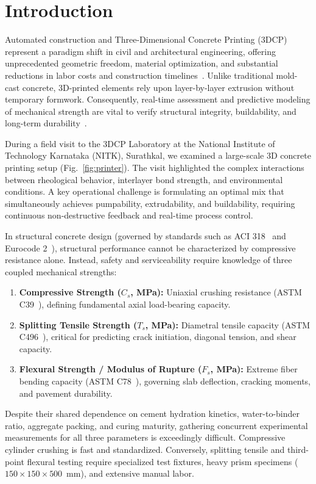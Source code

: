 \documentclass[conference]{IEEEtran}
\begin{document}
\section{Introduction}

Automated construction and Three-Dimensional Concrete Printing (3DCP) represent a paradigm shift in civil and architectural engineering, offering unprecedented geometric freedom, material optimization, and substantial reductions in labor costs and construction timelines~\cite{buswell20183d, ali2023machine}. Unlike traditional mold-cast concrete, 3D-printed elements rely upon layer-by-layer extrusion without temporary formwork. Consequently, real-time assessment and predictive modeling of mechanical strength are vital to verify structural integrity, buildability, and long-term durability~\cite{zhang2025research}.

During a field visit to the 3DCP Laboratory at the National Institute of Technology Karnataka (NITK), Surathkal, we examined a large-scale 3D concrete printing setup (Fig.~\ref{fig:printer}). The visit highlighted the complex interactions between rheological behavior, interlayer bond strength, and environmental conditions. A key operational challenge is formulating an optimal mix that simultaneously achieves pumpability, extrudability, and buildability, requiring continuous non-destructive feedback and real-time process control.

In structural concrete design (governed by standards such as ACI 318~\cite{aci318_19} and Eurocode 2~\cite{eurocode2}), structural performance cannot be characterized by compressive resistance alone. Instead, safety and serviceability require knowledge of three coupled mechanical strengths:
\begin{enumerate}
    \item \textbf{Compressive Strength ($C_s$, MPa):} Uniaxial crushing resistance (ASTM C39~\cite{astm_c39}), defining fundamental axial load-bearing capacity.
    \item \textbf{Splitting Tensile Strength ($T_s$, MPa):} Diametral tensile capacity (ASTM C496~\cite{astm_c496}), critical for predicting crack initiation, diagonal tension, and shear capacity.
    \item \textbf{Flexural Strength / Modulus of Rupture ($F_s$, MPa):} Extreme fiber bending capacity (ASTM C78~\cite{astm_c78}), governing slab deflection, cracking moments, and pavement durability.
\end{enumerate}

Despite their shared dependence on cement hydration kinetics, water-to-binder ratio, aggregate packing, and curing maturity, gathering concurrent experimental measurements for all three parameters is exceedingly difficult. Compressive cylinder crushing is fast and standardized. Conversely, splitting tensile and third-point flexural testing require specialized test fixtures, heavy prism specimens ($150 \times 150 \times 500$~mm), and extensive manual labor.
\end{document}
